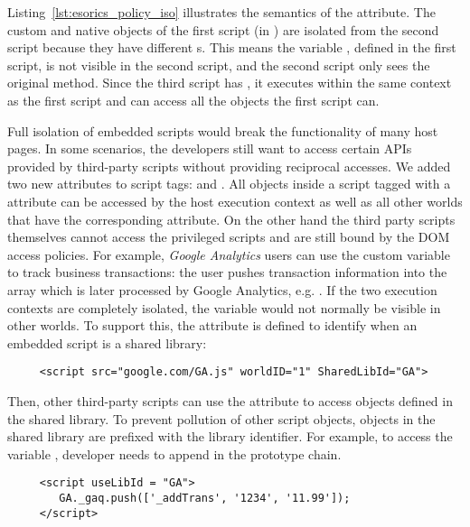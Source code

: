 Listing~\ref{lst:esorics_policy_iso} illustrates the semantics of the  attribute.  The custom and native objects of the first script (in ) are isolated from the second script because they have different s.  This means the variable , defined in the first script, is not visible in the second script, and the second script only sees the original  method.  Since the third script has , it executes within the same context as the first script and can access all the objects the first script can.  

 Full isolation of embedded scripts would break the functionality of many host pages.  In some scenarios, the developers still want to access certain APIs provided by third-party scripts without providing reciprocal accesses.  We added two new attributes to script tags:  and .  All objects inside a script tagged with a  attribute can be accessed by the host execution context as well as all other worlds that have the corresponding  attribute.  On the other hand the third party scripts themselves cannot access the privileged scripts and are still bound by the DOM access policies.  For example, \emph{Google Analytics} users can use the custom variable  to track business transactions: the user pushes transaction information into the array  which is later processed by Google Analytics, e.g. .  If the two execution contexts are completely isolated, the  variable would not normally be visible in other worlds.  To support this, the  attribute is defined to identify when an embedded script is a shared library:

\lstset{xleftmargin=.1\textwidth,xrightmargin=.1\textwidth}
\begin{lstlisting}
     <script src="google.com/GA.js" worldID="1" SharedLibId="GA">
\end{lstlisting}
Then, other third-party scripts can use the  attribute to access objects defined in the shared library.  To prevent pollution of other script objects, objects in the shared library are prefixed with the library identifier.  For example, to access the variable , developer needs to append  in the prototype chain.

\begin{lstlisting}
     <script useLibId = "GA">
        GA._gaq.push(['_addTrans', '1234', '11.99']);
     </script>
\end{lstlisting}

